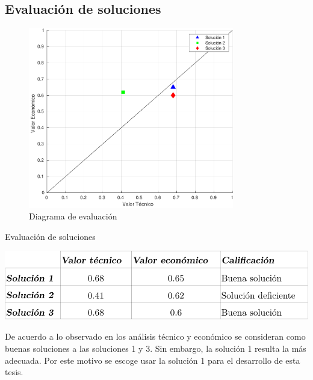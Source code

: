 \subsection{Evaluación de soluciones}
\begin{figure}[htbp!]
\centering
\includegraphics[width=0.8\textwidth]{grafico.pdf}
\caption{Diagrama de evaluación}
\label{diag:diag_eval}
\end{figure}

\begin{table}[htbp!]
  \centering
  \caption{Evaluación de soluciones}
  \label{diag:eval_sol}
  \includegraphics[width=0.9\linewidth]{tab_puntaje.pdf}
\end{table}

De acuerdo a lo observado en los análisis técnico y económico se consideran como buenas soluciones a las soluciones 1 y 3. Sin embargo, la solución 1 resulta la más adecuada. Por este motivo se escoge usar la solución 1 para el desarrollo de esta tesis.
